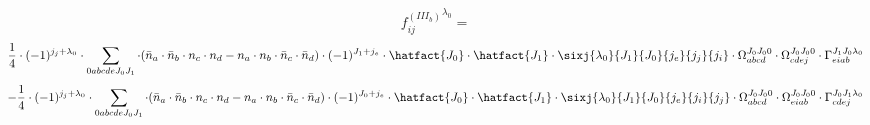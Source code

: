 
\begin{dmath*}
{f^{(III_b)}_{i j}}^{{{\lambda}}_{0}} =\end{dmath*}
\begin{dmath*}
\frac{1}{4} \cdot (-1)^{{j}_{j}+{{\lambda}}_{0}} \cdot \sum_{0 a b c d e {J}_{0} {J}_{1}} \cdot (\bar{n}_{a} \cdot \bar{n}_{b} \cdot n_{c} \cdot n_{d} -n_{a} \cdot n_{b} \cdot \bar{n}_{c} \cdot \bar{n}_{d}) \cdot (-1)^{{J}_{1}+{j}_{e}} \cdot \hatfact{{J}_{0}} \cdot \hatfact{{J}_{1}} \cdot \sixj{{{\lambda}}_{0}}{{J}_{1}}{{J}_{0}}{{j}_{e}}{{j}_{j}}{{j}_{i}} \cdot \Omega_{a b c d}^{{J}_{0} {J}_{0} 0} \cdot \Omega_{c d e j}^{{J}_{0} {J}_{0} 0} \cdot \Gamma_{e i a b}^{{J}_{1} {J}_{0} {{\lambda}}_{0}}
\end{dmath*}
\begin{dmath*}
-\frac{1}{4} \cdot (-1)^{{j}_{j}+{{\lambda}}_{0}} \cdot \sum_{0 a b c d e {J}_{0} {J}_{1}} \cdot (\bar{n}_{a} \cdot \bar{n}_{b} \cdot n_{c} \cdot n_{d} -n_{a} \cdot n_{b} \cdot \bar{n}_{c} \cdot \bar{n}_{d}) \cdot (-1)^{{J}_{0}+{j}_{e}} \cdot \hatfact{{J}_{0}} \cdot \hatfact{{J}_{1}} \cdot \sixj{{{\lambda}}_{0}}{{J}_{1}}{{J}_{0}}{{j}_{e}}{{j}_{i}}{{j}_{j}} \cdot \Omega_{a b c d}^{{J}_{0} {J}_{0} 0} \cdot \Omega_{e i a b}^{{J}_{0} {J}_{0} 0} \cdot \Gamma_{c d e j}^{{J}_{0} {J}_{1} {{\lambda}}_{0}}
\end{dmath*}

